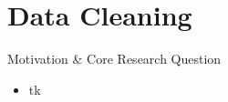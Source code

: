 \section{Data Cleaning}

\begin{frame}{Motivation \& Core Research Question}
  \begin{itemize}
    \item tk
  \end{itemize}
\end{frame}